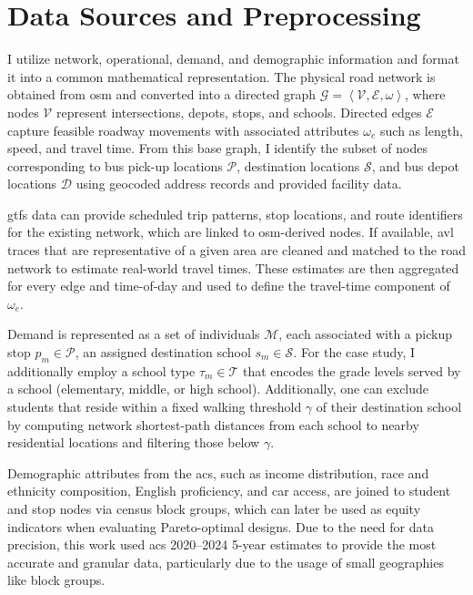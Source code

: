 \section{Data Sources and Preprocessing}

I utilize network, operational, demand, and demographic information and format it into a common mathematical representation. The physical road network is obtained from \gls{osm} and converted into a directed graph $\mathcal{G}=\left\langle\mathcal{V},\mathcal{E},\omega\right\rangle$, where nodes $\mathcal{V}$ represent intersections, depots, stops, and schools. Directed edges $\mathcal{E}$ capture feasible roadway movements with associated attributes $\omega_e$ such as length, speed, and travel time. From this base graph, I identify the subset of nodes corresponding to bus pick-up locations $\mathcal{P}$, destination locations $\mathcal{S}$, and bus depot locations $\mathcal{D}$ using geocoded address records and provided facility data.

\gls{gtfs} data can provide scheduled trip patterns, stop locations, and route identifiers for the existing network, which are linked to \gls{osm}-derived nodes. If available, \gls{avl} traces that are representative of a given area are cleaned and matched to the road network to estimate real-world travel times. These estimates are then aggregated for every edge and time-of-day and used to define the travel-time component of $\omega_e$.

Demand is represented as a set of individuals $\mathcal{M}$, each associated with a pickup stop $p_m\in \mathcal{P}$, an assigned destination school $s_m\in \mathcal{S}$. For the case study, I additionally employ a school type $\tau_m\in \mathcal{T}$ that encodes the grade levels served by a school (elementary, middle, or high school). Additionally, one can exclude students that reside within a fixed walking threshold $\gamma$ of their destination school by computing network shortest-path distances from each school to nearby residential locations and filtering those below $\gamma$. 

Demographic attributes from the \gls{acs}, such as income distribution, race and ethnicity composition, English proficiency, and car access, are joined to student and stop nodes via census block groups, which can later be used as equity indicators when evaluating Pareto-optimal designs. Due to the need for data precision, this work used \gls{acs} 2020--2024 5-year estimates to provide the most accurate and granular data, particularly due to the usage of small geographies like block groups.

